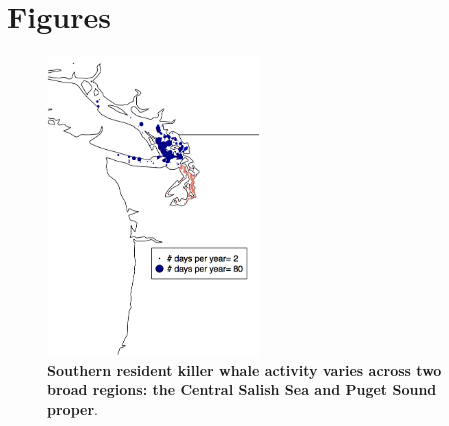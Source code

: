 \documentclass{article}
\begin{document}
\section* {Figures}

\begin{figure}[p]
\includegraphics[width=0.5\textwidth]{../analyses/figures/OrcaPhenPlots/srkw_justmap_assumeSRKW_April1.png} 
\caption{\textbf{Southern resident killer whale activity varies across two broad regions: the Central Salish Sea and Puget Sound proper}. }
 \label{fig:map}
 \end{figure}
 
\end{document}
